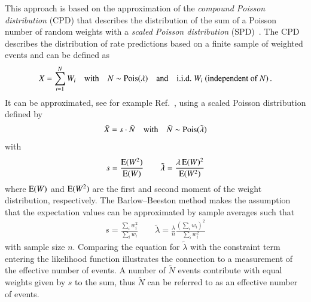 This approach is based on the approximation of the \emph{compound Poisson
  distribution} (CPD) that describes the distribution of the sum of a Poisson
number of random weights with a \emph{scaled Poisson distribution}
(SPD)~\cite{Bohm:2013gla}. The CPD describes the distribution of rate
predictions based on a finite sample of weighted events and can be defined as
\begin{align*}
  X = \sum_{i = 1}^{N} W_i \quad \text{with} \quad N \sim \operatorname{Pois}(\lambda) \quad \text{and} \quad \text{i.i.d.\ } W_i \text{ (independent of }N\text{)} \,\text{.}
\end{align*}
It can be approximated, see for example Ref.~\cite{Bohm:2013gla}, using a scaled
Poisson distribution defined by
\begin{align*}
  \tilde{X} = s \cdot \tilde{N} \quad \text{with} \quad \tilde{N} \sim \operatorname{Pois}(\tilde{\lambda})
\end{align*}
with
\begin{align*}
  s = \frac{\operatorname{E}(W^2)}{\operatorname{E}(W)} \qquad \tilde{\lambda} = \frac{\lambda \operatorname{E}(W)^2}{\operatorname{E}(W^2)}
\end{align*}
where $\operatorname{E}(W)$ and $\operatorname{E}(W^2)$ are the first and second moment of the
weight distribution, respectively. The Barlow--Beeston method makes the
assumption that the expectation values can be approximated by sample averages
such that
\begin{align*}
  s = \frac{\sum_i w_i^2}{\sum_i w_i} \qquad \tilde{\lambda} = \frac{\lambda}{n} \frac{(\sum_i w_i)^2}{\sum_i w_i^2}
\end{align*}
with sample size $n$. Comparing the equation for $\tilde{\lambda}$ with the
constraint term entering the likelihood function illustrates the connection to a
measurement of the effective number of events. A number of $\tilde{N}$ events
contribute with equal weights given by $s$ to the sum, thus $\tilde{N}$ can be
referred to as an effective number of events.



